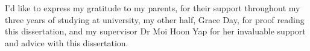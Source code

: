 I'd like to express my gratitude to my parents, for their support throughout my three years of studying at university, my other half, Grace Day, for proof reading this dissertation, and my supervisor Dr Moi Hoon Yap for her invaluable support and advice with this dissertation.